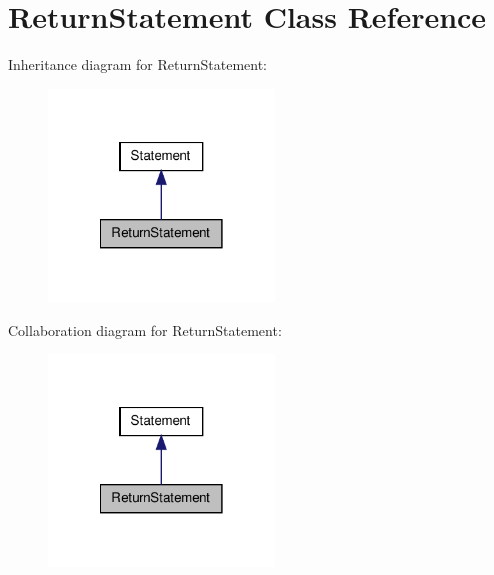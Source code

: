 \hypertarget{class_return_statement}{\section{Return\-Statement Class Reference}
\label{class_return_statement}
}


Inheritance diagram for Return\-Statement\-:
\nopagebreak
\begin{figure}[H]
\begin{center}
\leavevmode
\includegraphics[width=170pt]{class_return_statement__inherit__graph}
\end{center}
\end{figure}


Collaboration diagram for Return\-Statement\-:
\nopagebreak
\begin{figure}[H]
\begin{center}
\leavevmode
\includegraphics[width=170pt]{class_return_statement__coll__graph}
\end{center}
\end{figure}
